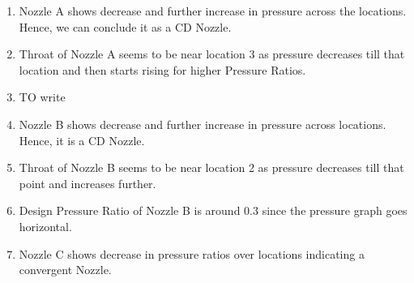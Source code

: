 \begin{enumerate}
    \item Nozzle A shows decrease and further increase in pressure across the locations. Hence, we can conclude it as a CD Nozzle.
    \item Throat of Nozzle A seems to be near location 3 as pressure decreases till that location and then starts rising for higher Pressure Ratios.
    
    \item TO write
    \item Nozzle B shows decrease and further increase in pressure across locations. Hence, it is a CD Nozzle.
    \item Throat of Nozzle B seems to be near location 2 as pressure decreases till that point and increases further.
    \item Design Pressure Ratio of Nozzle B is around 0.3 since the pressure graph goes horizontal.
    \item Nozzle C shows decrease in pressure ratios over locations indicating a convergent Nozzle.
    
\end{enumerate}
